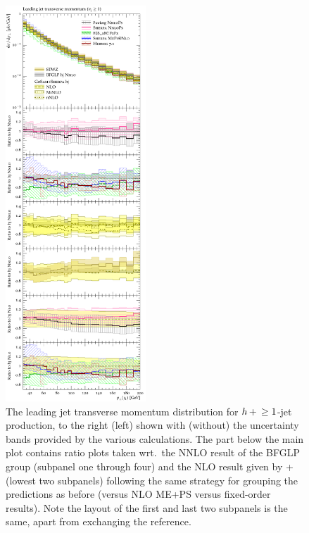 \begin{figure}[p!]
  \includegraphics[width=0.47\textwidth]{figures/hjetscomp_jet1_pT_incl.pdf}
  \caption{\label{fig:hjetscomp:results:1obs:j1pt}%
    The leading jet transverse momentum distribution for
    $h\!\text{~+~}\!\ge1$-jet production, to the right (left) shown with
    (without) the uncertainty bands provided by the various
    calculations. The part below the main plot contains ratio plots
    taken wrt.~the NNLO result of the BFGLP group (subpanel one
    through four) and the NLO result given by \GoSam+\Sherpa (lowest
    two subpanels) following the same strategy for grouping the
    predictions as before (\NNLOPS versus NLO ME+PS versus fixed-order
    results). Note the layout of the first and last two subpanels is
    the same, apart from exchanging the reference.}
\end{figure}

